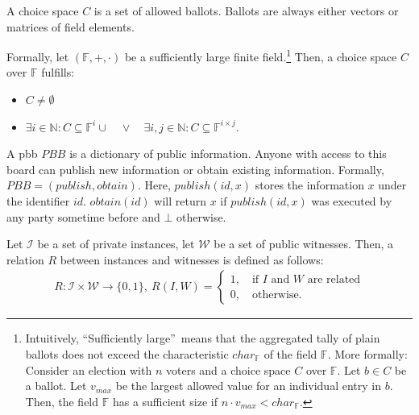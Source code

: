 \begin{definition}
  \label{def:choiceSpace}
    A choice space $C$ is a set of allowed ballots. 
    Ballots are always either vectors or matrices of field elements.

    Formally, let $(\mathbb{F}, +, \cdot)$ be a sufficiently large finite field.\footnote{\label{footnote:choiceSpaceSize}
      Intuitively, ``Sufficiently large''\ means that the aggregated tally of plain ballots does not exceed the characteristic $char_\mathbb{F}$ of the field $\mathbb{F}$.
      More formally: 
      Consider an election with $n$ voters and a choice space $C$ over $\mathbb{F}$.
      Let $b\in C$ be a ballot. 
      Let $v_{max}$ be the largest allowed value for an individual entry in $b$.
      Then, the field $\mathbb{F}$ has a sufficient size if $n\cdot v_{max} < char_\mathbb{F}$.
    }
    Then, a choice space $C$ over $\mathbb{F}$ fulfills: 
    \begin{itemize}
      \item $C\neq \emptyset$
      \item $\exists i\in\mathbb{N}:C\subseteq\mathbb{F}^{i}\cup \quad\lor\quad \exists i,j\in\mathbb{N}: C\subseteq\mathbb{F}^{i\times j}$.
    \end{itemize}
    
\end{definition}

\begin{definition}
  \label{def:pbb}
  A \gls{pbb} $PBB$ is a dictionary of public information.
  Anyone with access to this board can publish new information or obtain existing information.
  Formally, $PBB=(publish, obtain)$. 
  Here, $publish(id, x)$ stores the information $x$ under the identifier $id$. 
  $obtain(id)$ will return $x$ if $publish(id, x)$ was executed by any party sometime before and $\bot$ otherwise.
\end{definition}

\begin{definition}
  \label{def:relation}
  Let $\mathcal{I}$ be a set of private instances, let $\mathcal{W}$ be a set of public witnesses.
  Then, a relation $R$ between instances and witnesses is defined as follows:
  \begin{align*}
    R:\mathcal{I}\times\mathcal{W}\to\{0,1\},\:R(I, W) = \begin{cases}
      1, \quad\text{if } I \text{ and } W \text{ are related}\\
      0, \quad\text{otherwise.}
    \end{cases}
  \end{align*}
\end{definition}

